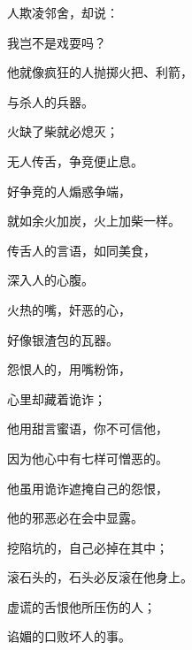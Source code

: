 {\par }{\Q {}人欺凌邻舍，却说：
\par }{\Q 我岂不是戏耍吗？
\par }{\Q 他就像疯狂的人抛掷火把、利箭，
\par }{\Q 与杀人的兵器。
\par }{\Q {}火缺了柴就必熄灭；
\par }{\Q 无人传舌，争竞便止息。
\par }{\Q {}好争竞的人煽惑争端，
\par }{\Q 就如余火加炭，火上加柴一样。
\par }{\Q {}传舌人的言语，如同美食，
\par }{\Q 深入人的心腹。
\par }{\Q {}火热的嘴，奸恶的心，
\par }{\Q 好像银渣包的瓦器。
\par }{\Q {}怨恨人的，用嘴粉饰，
\par }{\Q 心里却藏着诡诈；
\par }{\Q {}他用甜言蜜语，你不可信他，
\par }{\Q 因为他心中有七样可憎恶的。
\par }{\Q {}他虽用诡诈遮掩自己的怨恨，
\par }{\Q 他的邪恶必在会中显露。
\par }{\Q {}挖陷坑的，自己必掉在其中；
\par }{\Q 滚石头的，石头必反滚在他身上。
\par }{\Q {}虚谎的舌恨他所压伤的人；
\par }{\Q 谄媚的口败坏人的事。

}
